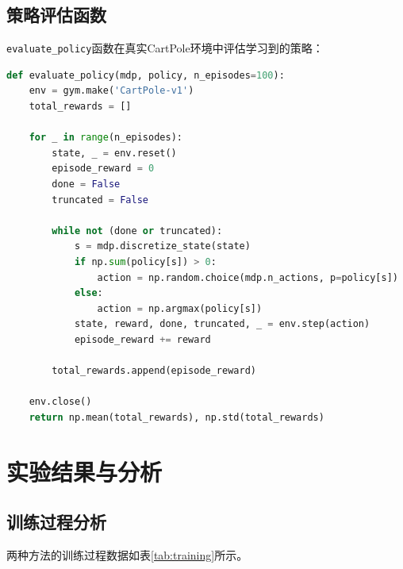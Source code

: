 \documentclass[12pt,a4paper]{article}
\begin{document}
\subsection{策略评估函数}

\texttt{evaluate\_policy}函数在真实CartPole环境中评估学习到的策略：

\begin{lstlisting}[language=Python]
def evaluate_policy(mdp, policy, n_episodes=100):
    env = gym.make('CartPole-v1')
    total_rewards = []
    
    for _ in range(n_episodes):
        state, _ = env.reset()
        episode_reward = 0
        done = False
        truncated = False
        
        while not (done or truncated):
            s = mdp.discretize_state(state)
            if np.sum(policy[s]) > 0:
                action = np.random.choice(mdp.n_actions, p=policy[s])
            else:
                action = np.argmax(policy[s])
            state, reward, done, truncated, _ = env.step(action)
            episode_reward += reward
            
        total_rewards.append(episode_reward)
    
    env.close()
    return np.mean(total_rewards), np.std(total_rewards)
\end{lstlisting}

\section{实验结果与分析}

\subsection{训练过程分析}

两种方法的训练过程数据如表\ref{tab:training}所示。
\end{document}
